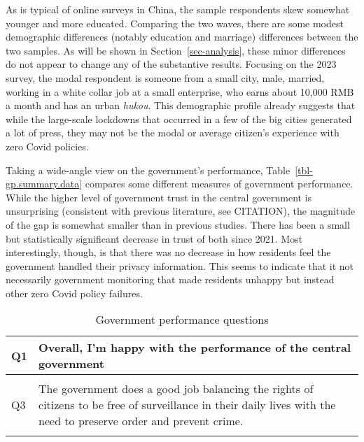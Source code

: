 \documentclass[
  letterpaper,
  DIV=11,
  numbers=noendperiod]{scrartcl}
\begin{document}
As is typical of online surveys in China, the sample respondents skew
somewhat younger and more educated. Comparing the two waves, there are
some modest demographic differences (notably education and marriage)
differences between the two samples. As will be shown in
Section~\ref{sec-analysis}, these minor differences do not appear to
change any of the substantive results. Focusing on the 2023 survey, the
modal respondent is someone from a small city, male, married, working in
a white collar job at a small enterprise, who earns about 10,000 RMB a
month and has an urban \emph{hukou}. This demographic profile already
suggests that while the large-scale lockdowns that occurred in a few of
the big cities generated a lot of press, they may not be the modal or
average citizen's experience with zero Covid policies.

Taking a wide-angle view on the government's performance,
Table~\ref{tbl-gp.summary.data} compares some different measures of
government performance. While the higher level of government trust in
the central government is unsurprising (consistent with previous
literature, see CITATION), the magnitude of the gap is somewhat smaller
than in previous studies. There has been a small but statistically
significant decrease in trust of both since 2021. Most interestingly,
though, is that there was no decrease in how residents feel the
government handled their privacy information. This seems to indicate
that it not necessarily government monitoring that made residents
unhappy but instead other zero Covid policy failures.

\hypertarget{tbl-gp.q.text}{}
\begin{table}
\caption{\label{tbl-gp.q.text}Government performance questions }\tabularnewline

\centering
\begin{tabular}[t]{l|>{\raggedright\arraybackslash}p{5in}}
\hline
Q1 & Overall, I’m happy with the performance of the central government\\
\hline
\cellcolor{gray!6}{Q2} & \cellcolor{gray!6}{Overall, I’m happy with the performance of my local government}\\
\hline
Q3 & The government does a good job balancing the rights of citizens to be free of surveillance in their daily lives with the need to preserve order and prevent crime.\\
\hline
\cellcolor{gray!6}{Q4} & \cellcolor{gray!6}{Government performance index of Q1 + Q2 + Q3}\\
\hline
\end{tabular}
\end{table}
\end{document}
